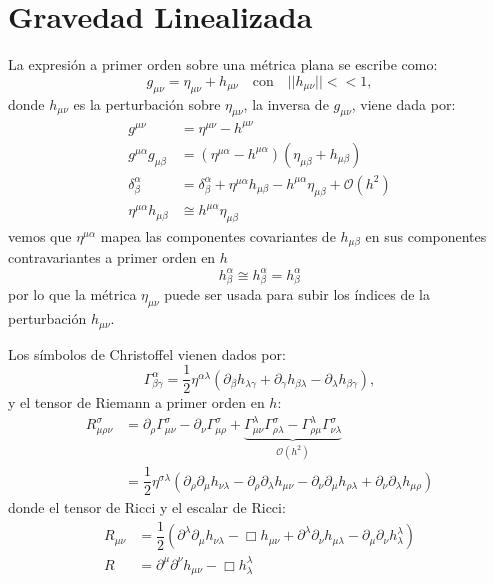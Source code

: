 \documentclass[../main]{subfiles}
\begin{document}
    \section{Gravedad Linealizada}

La expresión a primer orden sobre una métrica plana se escribe como:
\begin{equation}
    g_{\mu\nu}=\eta_{\mu\nu}+h_{\mu\nu} \quad \text{con} \quad ||h_{\mu\nu}|| << 1,
\end{equation}
donde $h_{\mu\nu}$ es la perturbación sobre $\eta_{\mu\nu}$, la inversa de $g_{\mu\nu}$, viene dada por:
\begin{equation}
    \begin{split}
        g^{\mu\nu}&=\eta^{\mu\nu}-h^{\mu\nu} \\
        g^{\mu\alpha}g_{\mu\beta}&=(\eta^{\mu\alpha}-h^{\mu\alpha})(\eta_{\mu\beta}+h_{\mu\beta}) \\
        \delta^{\alpha}_{\beta}&=\delta^{\alpha}_{\beta}+\eta^{\mu\alpha} h_{\mu\beta}-h^{\mu\alpha}\eta_{\mu\beta}+\mathcal{O}(h^2)\\
        \eta^{\mu\alpha}h_{\mu\beta} &\cong h^{\mu\alpha}\eta_{\mu\beta}
    \end{split}
\end{equation}
vemos que $\eta^{\mu\alpha}$ mapea las componentes covariantes de $h_{\mu\beta}$ en sus componentes contravariantes a primer orden en $h$ 
\begin{equation}
    h^{\alpha}_{\beta} \cong h^{\alpha}_{\beta}=h^{\alpha}_{\beta}
\end{equation}
por lo que la métrica $\eta_{\mu\nu}$ puede ser usada para subir los índices de la perturbación $h_{\mu\nu}$.

Los símbolos de Christoffel vienen dados por:
\begin{equation}
    \Gamma^{\alpha}_{\beta\gamma}=\dfrac{1}{2}\eta^{\alpha\lambda}(\partial_{\beta}h_{\lambda\gamma}+\partial_{\gamma}h_{\beta\lambda}-\partial_{\lambda}h_{\beta\gamma}),
\end{equation}
y el tensor de Riemann a primer orden en $h$:
\begin{equation}
    \begin{split}
        R^{\sigma}_{\mu\rho\nu}&=\partial_{\rho} \Gamma^{\sigma}_{\mu\nu}-\partial_{\nu}\Gamma^{\sigma}_{\mu\rho}+\underbrace{\Gamma^{\lambda}_{\mu\nu}\Gamma^{\sigma}_{\rho\lambda}-\Gamma^{\lambda}_{\rho\mu}\Gamma^{\sigma}_{\nu\lambda}}_{\mathcal{O}(h^2)} \\
        &=\dfrac{1}{2}\eta^{\sigma\lambda}(\partial_{\rho}\partial_{\mu}h_{\nu\lambda}-\partial_{\rho}\partial_{\lambda}h_{\mu\nu}-\partial_{\nu}\partial_{\mu}h_{\rho\lambda}+\partial_{\nu}\partial_{\lambda}h_{\mu\rho})
    \end{split}
\end{equation}
donde el tensor de Ricci y el escalar de Ricci:
\begin{align}
    R_{\mu\nu}&=\dfrac{1}{2}(\partial^{\lambda}\partial_{\mu}h_{\nu\lambda}-\Box h_{\mu\nu}+\partial^{\lambda}\partial_{\nu}h_{\mu\lambda}-\partial_{\mu}\partial_{\nu}h^{\lambda}_{\lambda})\\
    R&=\partial^{\mu}\partial^{\nu}h_{\mu\nu}-\Box h^{\lambda}_{\lambda}
\end{align}
\end{document}
